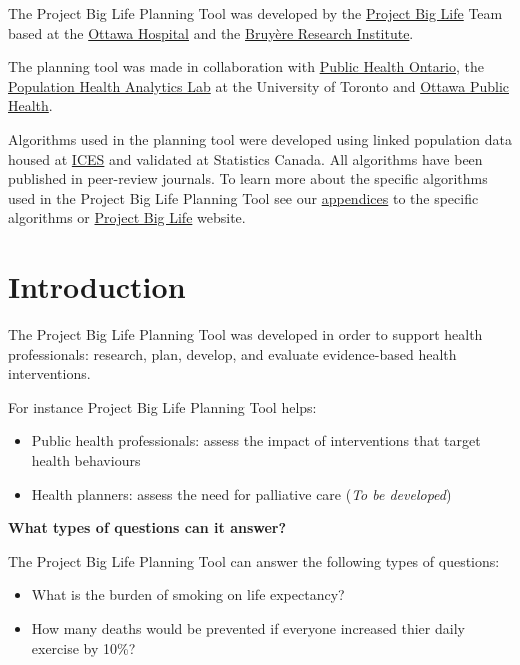 \documentclass[]{book}
\providecommand{\tightlist}{%
  \setlength{\itemsep}{0pt}\setlength{\parskip}{0pt}}
\begin{document}
The Project Big Life Planning Tool was developed by the
\href{https://www.projectbiglife.ca}{Project Big Life} Team based at the
\href{http://www.ohri.ca/home.asp}{Ottawa Hospital} and the
\href{https://www.bruyere.org/en/bruyere-research-institute}{Bruyère
Research Institute}.

The planning tool was made in collaboration with
\href{https://www.publichealthontario.ca/}{Public Health Ontario}, the
\href{https://pophealthanalytics.com/}{Population Health Analytics Lab}
at the University of Toronto and
\href{http://www.ottawapublichealth.ca/en/index.aspx}{Ottawa Public
Health}.

Algorithms used in the planning tool were developed using linked
population data housed at \href{https://www.ices.on.ca/}{ICES} and
validated at Statistics Canada. All algorithms have been published in
peer-review journals. To learn more about the specific algorithms used
in the Project Big Life Planning Tool see our
\protect\hyperlink{mport}{appendices} to the specific algorithms or
\href{https://www.projectbiglife.ca/science}{Project Big Life} website.

\chapter{Introduction}\label{introduction}

The Project Big Life Planning Tool was developed in order to support
health professionals: research, plan, develop, and evaluate
evidence-based health interventions.

For instance Project Big Life Planning Tool helps:

\begin{itemize}
\tightlist
\item
  Public health professionals: assess the impact of interventions that
  target health behaviours
\item
  Health planners: assess the need for palliative care (\emph{To be
  developed})
\end{itemize}

\textbf{What types of questions can it answer?}

The Project Big Life Planning Tool can answer the following types of
questions:

\begin{itemize}
\tightlist
\item
  What is the burden of smoking on life expectancy?
\item
  How many deaths would be prevented if everyone increased thier daily
  exercise by 10\%?
\end{itemize}
\end{document}
